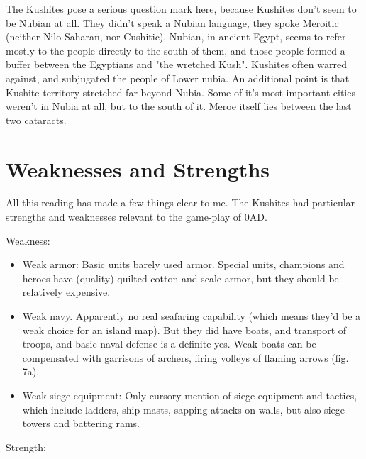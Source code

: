 \documentclass[a4paper,12pt]{scrreprt}
\begin{document}
The Kushites pose a serious question mark here, because Kushites don't seem to be Nubian at all. They didn't speak a Nubian language, they spoke Meroitic (neither Nilo-Saharan, nor Cushitic). Nubian, in ancient Egypt, seems to refer mostly to the people directly to the south of them, and those people formed a buffer between the Egyptians and "the wretched Kush". Kushites often warred against, and subjugated the people of Lower nubia. An additional point is that Kushite territory stretched far beyond Nubia. Some of it's most important cities weren't in Nubia at all, but to the south of it. Meroe itself lies between the last two cataracts. 

\section{Weaknesses and Strengths}

All this reading has made a few things clear to me. The Kushites had particular strengths and weaknesses relevant to the game-play of 0AD.

Weakness:

\begin{itemize}
	\item Weak armor: Basic units barely used armor. Special units, champions and heroes have (quality) quilted cotton and scale armor, but they should be relatively expensive.
	\item Weak navy. Apparently no real seafaring capability (which means they’d be a weak choice for an island map). But they did have boats, and transport of troops, and basic naval defense is a definite yes. Weak boats can be compensated with garrisons of archers, firing volleys of flaming arrows (fig. 7a).
	\item Weak siege equipment: Only cursory mention of siege equipment and tactics, which include ladders, ship-masts, sapping attacks on walls, but also siege towers and battering rams.
\end{itemize}

Strength:
\end{document}
